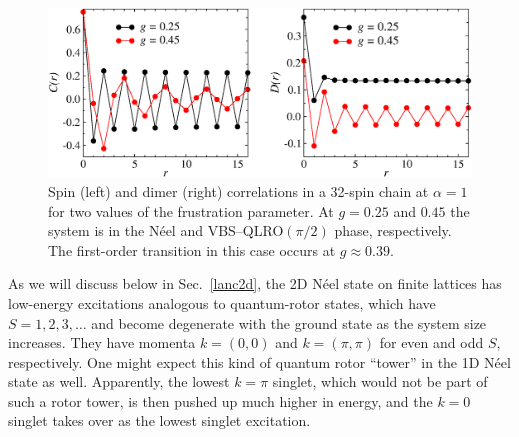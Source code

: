 \documentclass[draft,numberedheadings]{aipproc}
\begin{document}
\begin{figure}
\includegraphics[width=12.25cm, clip]{lrf_corr.eps}
\caption{Spin (left) and dimer (right) correlations in a 32-spin chain at $\alpha=1$ for two values of the frustration parameter. At $g=0.25$ 
and $0.45$ the system is in the N\'eel and VBS--QLRO$(\pi/2)$ phase, respectively. The first-order transition in this case occurs at $g\approx 0.39$.}
\label{lrf_corr}
\end{figure}

As we will discuss below in Sec.~\ref{lanc2d}, the 2D N\'eel state on finite
lattices has low-energy excitations analogous to quantum-rotor states, which have $S=1,2,3,\ldots$ and become degenerate with the ground state as 
the system size increases. They have momenta $k=(0,0)$ and $k=(\pi,\pi)$ for even and odd $S$, respectively. One might expect this kind of quantum 
rotor ``tower'' in the 1D N\'eel state as well. Apparently, the lowest $k=\pi$ singlet, which would not be part of such a rotor tower, is then pushed 
up much higher in energy, and the $k=0$ singlet takes over as the lowest singlet excitation.
\end{document}
